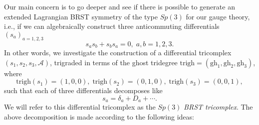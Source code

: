 \documentclass[a4paper,12pt]{article}
\begin{document}
Our main concern is to go deeper and see if there is possible to generate an
extended Lagrangian BRST symmetry of the type $Sp(3)$ for our gauge theory,
i.e., if we can algebraically construct three anticommuting differentials $%
\left( s_{a}\right) _{a=1,2,3}$ 
\begin{equation}
s_{a}s_{b}+s_{b}s_{a}=0,\;a,b=1,2,3.  \label{sp3.8}
\end{equation}
In other words, we investigate the construction of a differential tricomplex 
$\left( s_{1},s_{2},s_{3},\mathcal{A}\right) $, trigraded in terms of the
ghost tridegree $\mathrm{trigh}=\left( \mathrm{gh}_{1},\mathrm{gh}_{2},%
\mathrm{gh}_{3}\right) $, where 
\begin{equation}
\mathrm{trigh}\left( s_{1}\right) =\left( 1,0,0\right) ,\;\mathrm{trigh}%
\left( s_{2}\right) =\left( 0,1,0\right) ,\;\mathrm{trigh}\left(
s_{3}\right) =\left( 0,0,1\right) ,  \label{sp3.9}
\end{equation}
such that each of three differentials decomposes like 
\begin{equation}
s_{a}=\delta _{a}+D_{a}+\cdots .  \label{sp3.10}
\end{equation}
We will refer to this differential tricomplex as the $Sp(3)$ \textit{BRST
tricomplex}. The above decomposition is made according to the following
ideas:
\end{document}
